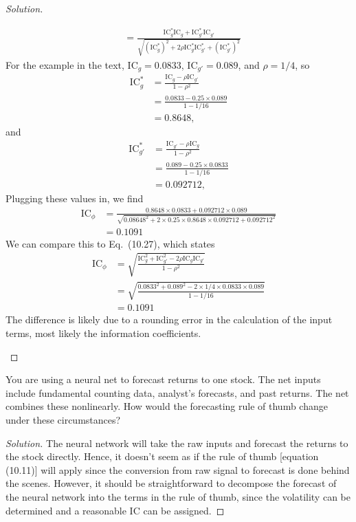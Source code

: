 \begin{proof}[Solution]
\begin{enumerate}[label=(\alph*)]
\begin{align*}
	&= \frac{\mathrm{IC}_{g}^{\ast}\mathrm{IC}_{g} + \mathrm{IC}_{g'}^{\ast}\mathrm{IC}_{g'}}{\sqrt{(\mathrm{IC}_{g}^{\ast})^{2} + 2\rho\mathrm{IC}_{g}^{\ast}\mathrm{IC}_{g'}^{\ast} + (\mathrm{IC}_{g'}^{\ast})^{2}}}
	\end{align*}	    
    For the example in the text, $\mathrm{IC}_{g}=0.0833$, $\mathrm{IC}_{g'}=0.089$, and $\rho =
1/4$, so 
	\begin{align*}
	\mathrm{IC}_{g}^{\ast} &= \frac{\mathrm{IC}_{g} - \rho\mathrm{IC}_{g'}}{1 - \rho^{2}}\\
	&= \frac{0.0833 - 0.25 \times 0.089}{1 - 1/16}\\
	&= 0.8648,
	\end{align*}
	and
	\begin{align*}
	\mathrm{IC}_{g'}^{\ast} &= \frac{\mathrm{IC}_{g'} - \rho\mathrm{IC}_{g}}{1 - \rho^{2}}\\
	&= \frac{0.089 - 0.25 \times 0.0833}{1 - 1/16}\\
	&= 0.092712,
	\end{align*}
 Plugging these values in, we find
  \begin{align*}
  \mathrm{IC}_{\phi} &= \frac{0.8648 \times 0.0833 + 0.092712 \times 0.089}{\sqrt{0.08648^{2} + 2 \times 0.25 \times 0.8648 \times 0.092712 + 0.092712^{2}}}\\
  &= 0.1091
  \end{align*}
  We can compare this to Eq.\ (10.27), which states
  \begin{align*}
   \mathrm{IC}_{\phi}&=\sqrt{\frac{\mathrm{IC}_{g}^{2}+\mathrm{IC}_{g'}^{2}-2\rho\mathrm{IC}_{g}\mathrm{IC}_{g'}}{1-\rho^{2}}}\\
		       &=\sqrt{\frac{0.0833^2+0.089^2-2\times1/4\times0.0833\times0.089}{1-1/16}}\\
		       &=0.1091
  \end{align*}
   The difference is likely due to a rounding error in the calculation of the input terms, most likely the information coefficients.
  \end{enumerate}

\end{proof}


\begin{problem}{10.5}
  You are using a neural net to forecast returns to one stock. The net inputs include fundamental counting data, analyst's forecasts, and past returns. The net combines these nonlinearly. How would the forecasting rule of thumb change under these circumstances?
\end{problem}

\begin{proof}[Solution]
  The neural network will take the raw inputs and forecast the returns to the stock directly. Hence, it doesn't seem as if the rule of thumb [equation (10.11)] will apply since the conversion from raw signal to forecast is done behind the scenes. However, it should be straightforward to decompose the forecast of the neural network into the terms in the rule of thumb, since the volatility can be determined and a reasonable IC can be assigned.
\end{proof}

